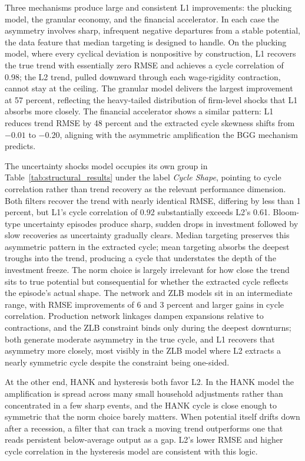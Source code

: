 \documentclass[10pt]{article}
\begin{document}
Three mechanisms produce large and consistent L1 improvements: the plucking model, the granular economy, and the financial accelerator. In each case the asymmetry involves sharp, infrequent negative departures from a stable potential, the data feature that median targeting is designed to handle. On the plucking model, where every cyclical deviation is nonpositive by construction, L1 recovers the true trend with essentially zero RMSE and achieves a cycle correlation of 0.98; the L2 trend, pulled downward through each wage-rigidity contraction, cannot stay at the ceiling. The granular model delivers the largest improvement at 57 percent, reflecting the heavy-tailed distribution of firm-level shocks that L1 absorbs more closely. The financial accelerator shows a similar pattern: L1 reduces trend RMSE by 48 percent and the extracted cycle skewness shifts from $-0.01$ to $-0.20$, aligning with the asymmetric amplification the BGG mechanism predicts.

The uncertainty shocks model occupies its own group in Table~\ref{tab:structural_results} under the label \textit{Cycle Shape}, pointing to cycle correlation rather than trend recovery as the relevant performance dimension. Both filters recover the trend with nearly identical RMSE, differing by less than 1 percent, but L1's cycle correlation of 0.92 substantially exceeds L2's 0.61. Bloom-type uncertainty episodes produce sharp, sudden drops in investment followed by slow recoveries as uncertainty gradually clears. Median targeting preserves this asymmetric pattern in the extracted cycle; mean targeting absorbs the deepest troughs into the trend, producing a cycle that understates the depth of the investment freeze. The norm choice is largely irrelevant for how close the trend sits to true potential but consequential for whether the extracted cycle reflects the episode's actual shape. The network and ZLB models sit in an intermediate range, with RMSE improvements of 6 and 3 percent and larger gains in cycle correlation. Production network linkages dampen expansions relative to contractions, and the ZLB constraint binds only during the deepest downturns; both generate moderate asymmetry in the true cycle, and L1 recovers that asymmetry more closely, most visibly in the ZLB model where L2 extracts a nearly symmetric cycle despite the constraint being one-sided.

At the other end, HANK and hysteresis both favor L2. In the HANK model the amplification is spread across many small household adjustments rather than concentrated in a few sharp events, and the HANK cycle is close enough to symmetric that the norm choice barely matters. When potential itself drifts down after a recession, a filter that can track a moving trend outperforms one that reads persistent below-average output as a gap. L2's lower RMSE and higher cycle correlation in the hysteresis model are consistent with this logic.
\end{document}
